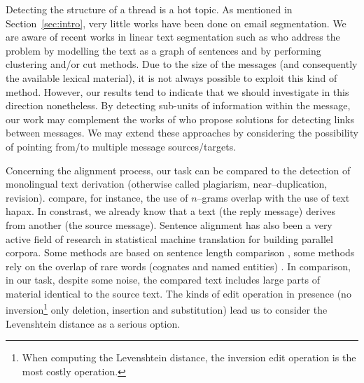 Detecting the structure of a thread is a hot topic. 
%
As mentioned in Section~\ref{sec:intro}, very little works have been done on email segmentation. 
We are aware of recent works in linear text segmentation such as \cite{kazantseva:2011} who address the problem by modelling the text as a graph of sentences and by performing clustering and/or cut methods. 
%
Due to the size of the messages (and consequently the available lexical material), it is not always possible to exploit this kind of method. However, our results tend to indicate that we should investigate in this direction nonetheless.
%
By detecting sub-units of information within the message, our work may complement the works of \cite{li:2011:threadlinking,kim:2010:taggingandlinking} who propose solutions for detecting links between messages. 
We may extend these approaches by considering the possibility of pointing from/to multiple message sources/targets. %

Concerning the alignment process, our task can be compared to the detection of monolingual text derivation (otherwise called plagiarism, near–duplication, revision). \cite{poulard:2011:detecting} compare, for instance, the use of $n$–grams overlap with the use of text hapax. 
In constrast, we already know that a text (the reply message) derives from another (the source message). Sentence alignment has also been a very active field of research 
in statistical machine translation for building parallel corpora. %
%
Some methods are based on sentence length comparison \cite{gale:1991}, some methods rely on the overlap of rare words (cognates and named entities) \cite{enright-kondrak:2007:ShortPapers}.
In comparison, %
in our task, despite some noise, the compared text includes large parts of material identical to the source text. 
The kinds of edit operation in presence (no inversion\footnote{When computing the Levenshtein distance, the inversion edit operation is the most costly operation.} only deletion, insertion and substitution) lead us to consider the Levenshtein distance as a serious option.  

